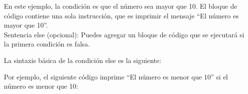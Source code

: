 En este ejemplo, la condición es que el número sea mayor que 10. El bloque de código contiene una sola instrucción, que es imprimir el mensaje ``El número es mayor que 10''.\\

Sentencia else (opcional): Puedes agregar un bloque de código que se ejecutará si la primera condición es falsa.

La sintaxis básica de la condición else es la siguiente:

\begin{figure}[h]
    \centering
  \end{figure}

Por ejemplo, el siguiente código imprime ``El número es menor que 10'' si el número es menor que 10:

\begin{figure}[h]
    \centering
  \end{figure}


